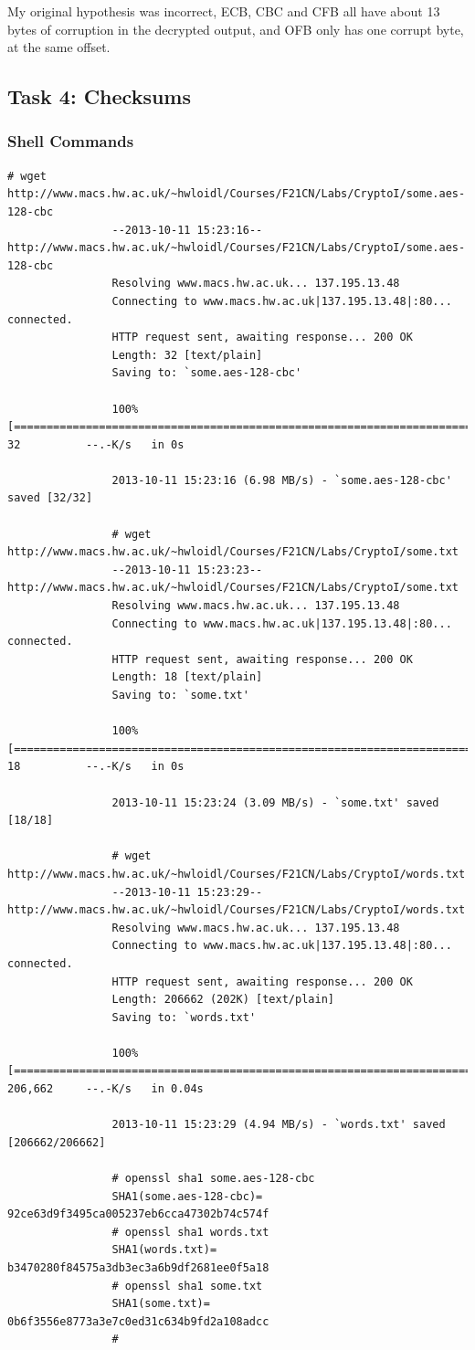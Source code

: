 			My original hypothesis was incorrect, ECB, CBC and CFB all have about 13 bytes of corruption in the decrypted output, and OFB only has one corrupt byte, at the same offset. 
			
	\pagebreak
	
	\subsection{Task 4: Checksums}
		
		\subsubsection{Shell Commands}
			\begin{lstlisting}[label={Shell Commands},caption={Task 1}]
				# wget http://www.macs.hw.ac.uk/~hwloidl/Courses/F21CN/Labs/CryptoI/some.aes-128-cbc
				--2013-10-11 15:23:16--  http://www.macs.hw.ac.uk/~hwloidl/Courses/F21CN/Labs/CryptoI/some.aes-128-cbc
				Resolving www.macs.hw.ac.uk... 137.195.13.48
				Connecting to www.macs.hw.ac.uk|137.195.13.48|:80... connected.
				HTTP request sent, awaiting response... 200 OK
				Length: 32 [text/plain]
				Saving to: `some.aes-128-cbc'

				100%[=========================================================================>] 32          --.-K/s   in 0s

				2013-10-11 15:23:16 (6.98 MB/s) - `some.aes-128-cbc' saved [32/32]

				# wget http://www.macs.hw.ac.uk/~hwloidl/Courses/F21CN/Labs/CryptoI/some.txt
				--2013-10-11 15:23:23--  http://www.macs.hw.ac.uk/~hwloidl/Courses/F21CN/Labs/CryptoI/some.txt
				Resolving www.macs.hw.ac.uk... 137.195.13.48
				Connecting to www.macs.hw.ac.uk|137.195.13.48|:80... connected.
				HTTP request sent, awaiting response... 200 OK
				Length: 18 [text/plain]
				Saving to: `some.txt'

				100%[=========================================================================>] 18          --.-K/s   in 0s

				2013-10-11 15:23:24 (3.09 MB/s) - `some.txt' saved [18/18]

				# wget http://www.macs.hw.ac.uk/~hwloidl/Courses/F21CN/Labs/CryptoI/words.txt
				--2013-10-11 15:23:29--  http://www.macs.hw.ac.uk/~hwloidl/Courses/F21CN/Labs/CryptoI/words.txt
				Resolving www.macs.hw.ac.uk... 137.195.13.48
				Connecting to www.macs.hw.ac.uk|137.195.13.48|:80... connected.
				HTTP request sent, awaiting response... 200 OK
				Length: 206662 (202K) [text/plain]
				Saving to: `words.txt'

				100%[=========================================================================>] 206,662     --.-K/s   in 0.04s

				2013-10-11 15:23:29 (4.94 MB/s) - `words.txt' saved [206662/206662]

				# openssl sha1 some.aes-128-cbc
				SHA1(some.aes-128-cbc)= 92ce63d9f3495ca005237eb6cca47302b74c574f
				# openssl sha1 words.txt
				SHA1(words.txt)= b3470280f84575a3db3ec3a6b9df2681ee0f5a18
				# openssl sha1 some.txt
				SHA1(some.txt)= 0b6f3556e8773a3e7c0ed31c634b9fd2a108adcc
				#
			\end{lstlisting}
			
